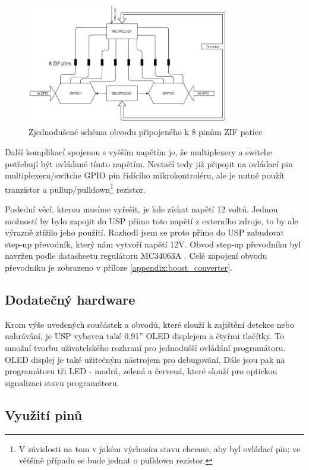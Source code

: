 \documentclass[11pt,a4paper,twoside,openright]{report}
\begin{document}
\begin{figure}[ht!]
  \includegraphics[width=0.8\textwidth]{img/simplified_pin_switches.png}
  \centering
  \caption{Zjednodušené schéma obvodu připojeného k 8 pinům ZIF patice}
  \label{fig:simplified_pin_switches}
\end{figure}

Další komplikací spojenou s vyšším napětím je, že multiplexery a switche potřebují být ovládané tímto napětím. Nestačí tedy již připojit na ovládací pin multiplexeru/switche GPIO pin řídícího mikrokontroléru, ale je nutné použít tranzistor a pullup/pulldown\footnote{V závislosti na tom v jakém výchozím stavu chceme, aby byl ovládací pin; ve většině případu se bude jednat o pulldown rezistor.} rezistor.

Poslední věcí, kterou musíme vyřešit, je kde získat napětí 12 voltů. Jednou možností by bylo zapojit do USP přímo toto napětí z externího zdroje, to by ale výrazně ztížilo jeho použití. Rozhodl jsem se proto přímo do USP zabudovat step-up převodník, který nám vytvoří napětí 12V. Obvod step-up převodníku byl navržen podle datasheetu regulátoru MC34063A \cite{step-up}. Celé zapojení obvodu převodníku je zobrazeno v příloze \ref{appendix:boost_converter}.

\subsection {Dodatečný hardware}

Krom výše uvedených součástek a obvodů, které slouží k zajištění detekce nebo nahrávání, je USP vybaven také 0.91'' OLED displejem a čtyřmi tlačítky. To umožní tvorbu uživatelského rozhraní pro jednodušší ovládání programátoru. OLED displej je také užitečným nástrojem pro debugování. Dále jsou pak na programátoru tři LED - modrá, zelená a červená, které slouží pro optickou signalizaci stavu programátoru.

\subsection {Využití pinů}
\end{document}
